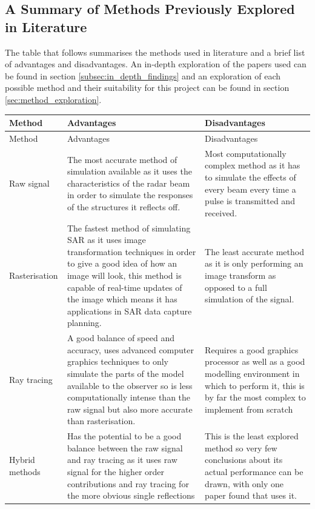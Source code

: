\subsection{A Summary of Methods Previously Explored in Literature}
The table that follows summarises the methods used in literature and a brief list of advantages and disadvantages. An in-depth exploration of the papers used can be found in section \ref{subsec:in_depth_findings} and an exploration of each possible method and their suitability for this project can be found in section \ref{sec:method_exploration}.
\begin{longtabu} to \textwidth {|X[0.5]|X|X|}
\hline

	Method & Advantages & Disadvantages\\
	\hline
	\endfirsthead
	\hline
	Method & Advantages & Disadvantages \\
	\hline 
	\endhead
	\hline
	\endfoot
	Raw signal & The most accurate method of simulation available as it uses the characteristics of the radar beam in order to simulate the responses of the structures it reflects off. & Most computationally complex method as it has to simulate the effects of every beam every time a pulse is transmitted and received. \\
	Rasterisation & The fastest method of simulating SAR as it uses image transformation techniques in order to give a good idea of how an image will look, this method is capable of real-time updates of the image which means it has applications in SAR data capture planning. & The least accurate method as it is only performing an image transform as opposed to a full simulation of the signal. \\
	Ray tracing & A good balance of speed and accuracy, uses advanced computer graphics techniques to only simulate the parts of the model available to the observer so is less computationally intense than the raw signal but also more accurate than rasterisation. & Requires a good graphics processor as well as a good modelling environment in which to perform it, this is by far the most complex to implement from scratch \\
	Hybrid methods & Has the potential to be a good balance between the raw signal and ray tracing as it uses raw signal for the higher order contributions and ray tracing for the more obvious single reflections & This is the least explored method so very few conclusions about its actual performance can be drawn, with only one paper found that uses it. \\
	
\end{longtabu}
